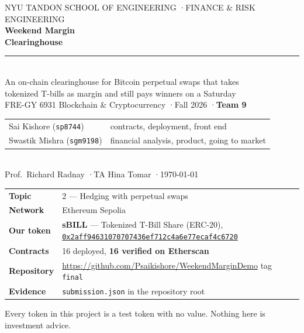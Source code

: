 \documentclass[11pt,a4paper]{article}
\newcommand{\note}[1]{{\small\color{muted}#1}}
\newcommand{\ead}[1]{{\footnotesize\href{https://sepolia.etherscan.io/address/#1}{\nolinkurl{#1}}}}
\begin{document}
\thispagestyle{empty}
\vspace*{1.2cm}
\begin{center}
{\footnotesize\color{muted}NYU TANDON SCHOOL OF ENGINEERING \quad·\quad FINANCE \& RISK ENGINEERING}\\[18pt]
{\Huge\bfseries\color{accent} Weekend Margin}\\[10pt]
{\LARGE\bfseries Clearinghouse}\\[16pt]
\rule{0.55\textwidth}{0.8pt}\\[14pt]
{\large An on-chain clearinghouse for Bitcoin perpetual swaps that takes\\ tokenized T-bills as margin and still pays winners on a Saturday}\\[22pt]
{\normalsize FRE-GY 6931 Blockchain \& Cryptocurrency \quad·\quad Fall 2026 \quad·\quad \textbf{Team 9}}\\[10pt]
\begin{tabular}{@{}ll@{}}
Sai Kishore \; (\texttt{sp8744}) & contracts, deployment, front end\\
Swastik Mishra \; (\texttt{sgm9198}) & financial analysis, product, going to market\\
\end{tabular}\\[14pt]
{\small Prof.\ Richard Radnay \quad·\quad TA Hina Tomar \quad·\quad \today}\\[20pt]
\colorbox{panel}{\parbox{0.86\textwidth}{\vspace{4pt}
\small
\begin{tabular}{@{}p{3.1cm}p{10.4cm}@{}}
\textbf{Topic} & 2 — Hedging with perpetual swaps \\
\textbf{Network} & Ethereum Sepolia \\
\textbf{Our token} & \textbf{sBILL} — Tokenized T-Bill Share (ERC-20), \ead{0x2aff94631070707436ef712c4a6e77ecaf4c6720} \\
\textbf{Contracts} & 16 deployed, \textbf{16 verified on Etherscan} \\
\textbf{Repository} & \url{https://github.com/Psaikishore/WeekendMarginDemo} \quad tag \texttt{final} \\
\textbf{Evidence} & \texttt{submission.json} in the repository root \\
\end{tabular}\vspace{4pt}}}
\end{center}

\vfill
\note{\centering Every token in this project is a test token with no value. Nothing here is investment advice.\par}
\clearpage
\end{document}
